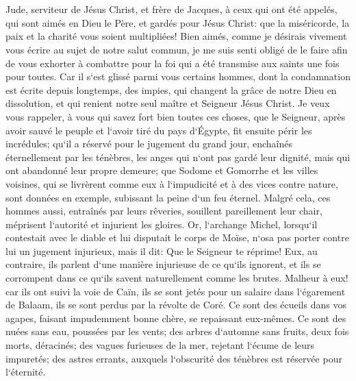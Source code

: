 

\chapter{}

\verse Jude, serviteur de Jésus Christ, et frère de Jacques, à ceux qui ont été appelés, qui sont aimés en Dieu le Père, et gardés pour Jésus Christ: 
\verse que la miséricorde, la paix et la charité vous soient multipliées! 
\verse Bien aimés, comme je désirais vivement vous écrire au sujet de notre salut commun, je me suis senti obligé de le faire afin de vous exhorter à combattre pour la foi qui a été transmise aux saints une fois pour toutes. 
\verse Car il s`est glissé parmi vous certains hommes, dont la condamnation est écrite depuis longtemps, des impies, qui changent la grâce de notre Dieu en dissolution, et qui renient notre seul maître et Seigneur Jésus Christ. 
\verse Je veux vous rappeler, à vous qui savez fort bien toutes ces choses, que le Seigneur, après avoir sauvé le peuple et l`avoir tiré du pays d`Égypte, fit ensuite périr les incrédules; 
\verse qu`il a réservé pour le jugement du grand jour, enchaînés éternellement par les ténèbres, les anges qui n`ont pas gardé leur dignité, mais qui ont abandonné leur propre demeure; 
\verse que Sodome et Gomorrhe et les villes voisines, qui se livrèrent comme eux à l`impudicité et à des vices contre nature, sont données en exemple, subissant la peine d`un feu éternel. 
\verse Malgré cela, ces hommes aussi, entraînés par leurs rêveries, souillent pareillement leur chair, méprisent l`autorité et injurient les gloires. 
\verse Or, l`archange Michel, lorsqu`il contestait avec le diable et lui disputait le corps de Moïse, n`osa pas porter contre lui un jugement injurieux, mais il dit: Que le Seigneur te réprime! 
\verse Eux, au contraire, ils parlent d`une manière injurieuse de ce qu`ils ignorent, et ils se corrompent dans ce qu`ils savent naturellement comme les brutes. 
\verse Malheur à eux! car ils ont suivi la voie de Caïn, ils se sont jetés pour un salaire dans l`égarement de Balaam, ils se sont perdus par la révolte de Coré. 
\verse Ce sont des écueils dans vos agapes, faisant impudemment bonne chère, se repaissant eux-mêmes. Ce sont des nuées sans eau, poussées par les vents; des arbres d`automne sans fruits, deux fois morts, déracinés; 
\verse des vagues furieuses de la mer, rejetant l`écume de leurs impuretés; des astres errants, auxquels l`obscurité des ténèbres est réservée pour l`éternité. 

